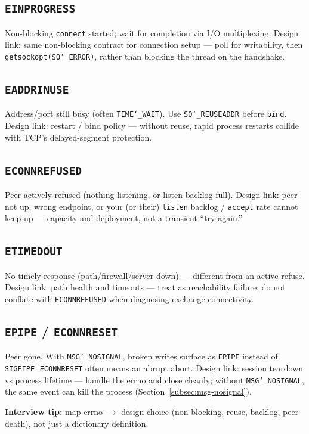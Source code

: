 \subsection{\texttt{EINPROGRESS}}
\label{subsec:einprogress}
Non-blocking \texttt{connect} started; wait for completion via I/O multiplexing.
\newline
Design link: same non-blocking contract for connection setup --- poll for writability, then 
\texttt{getsockopt(SO\char`_ERROR)}, rather than blocking the thread on the handshake.

\subsection{\texttt{EADDRINUSE}}
\label{subsec:eaddrinuse}
Address/port still busy (often \texttt{TIME\char`_WAIT}). Use \texttt{SO\char`_REUSEADDR} before \texttt{bind}.
\newline
Design link: restart / bind policy --- without reuse, rapid process restarts collide with 
TCP's delayed-segment protection.

\subsection{\texttt{ECONNREFUSED}}
\label{subsec:econnrefused}
Peer actively refused (nothing listening, or listen backlog full).
\newline
Design link: peer not up, wrong endpoint, or your (or their) \texttt{listen} backlog / 
\texttt{accept} rate cannot keep up --- capacity and deployment, not a transient ``try again.''

\subsection{\texttt{ETIMEDOUT}}
\label{subsec:etimedout}
No timely response (path/firewall/server down) --- different from an active refuse.
\newline
Design link: path health and timeouts --- treat as reachability failure; do not conflate with 
\texttt{ECONNREFUSED} when diagnosing exchange connectivity.

\subsection{\texttt{EPIPE} / \texttt{ECONNRESET}}
\label{subsec:epipe}
Peer gone. With \texttt{MSG\char`_NOSIGNAL}, broken writes surface as \texttt{EPIPE} instead of 
\texttt{SIGPIPE}. \texttt{ECONNRESET} often means an abrupt abort.
\newline
Design link: session teardown vs process lifetime --- handle the errno and close cleanly; 
without \texttt{MSG\char`_NOSIGNAL}, the same event can kill the process (Section~\ref{subsec:msg-nosignal}).
\par\noindent\textbf{Interview tip:} map errno $\rightarrow$ design choice (non-blocking, reuse, backlog, 
peer death), not just a dictionary definition.
